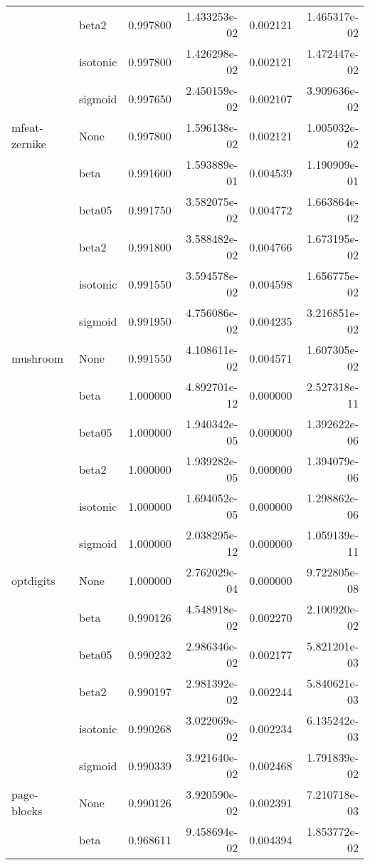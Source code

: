 \begin{tabular}{llrrrr}
        & beta2 &  0.997800 &  1.433253e-02 &  0.002121 &  1.465317e-02 \\
        & isotonic &  0.997800 &  1.426298e-02 &  0.002121 &  1.472447e-02 \\
        & sigmoid &  0.997650 &  2.450159e-02 &  0.002107 &  3.909636e-02 \\
mfeat-zernike & None &  0.997800 &  1.596138e-02 &  0.002121 &  1.005032e-02 \\
        & beta &  0.991600 &  1.593889e-01 &  0.004539 &  1.190909e-01 \\
        & beta05 &  0.991750 &  3.582075e-02 &  0.004772 &  1.663864e-02 \\
        & beta2 &  0.991800 &  3.588482e-02 &  0.004766 &  1.673195e-02 \\
        & isotonic &  0.991550 &  3.594578e-02 &  0.004598 &  1.656775e-02 \\
        & sigmoid &  0.991950 &  4.756086e-02 &  0.004235 &  3.216851e-02 \\
mushroom & None &  0.991550 &  4.108611e-02 &  0.004571 &  1.607305e-02 \\
        & beta &  1.000000 &  4.892701e-12 &  0.000000 &  2.527318e-11 \\
        & beta05 &  1.000000 &  1.940342e-05 &  0.000000 &  1.392622e-06 \\
        & beta2 &  1.000000 &  1.939282e-05 &  0.000000 &  1.394079e-06 \\
        & isotonic &  1.000000 &  1.694052e-05 &  0.000000 &  1.298862e-06 \\
        & sigmoid &  1.000000 &  2.038295e-12 &  0.000000 &  1.059139e-11 \\
optdigits & None &  1.000000 &  2.762029e-04 &  0.000000 &  9.722805e-08 \\
        & beta &  0.990126 &  4.548918e-02 &  0.002270 &  2.100920e-02 \\
        & beta05 &  0.990232 &  2.986346e-02 &  0.002177 &  5.821201e-03 \\
        & beta2 &  0.990197 &  2.981392e-02 &  0.002244 &  5.840621e-03 \\
        & isotonic &  0.990268 &  3.022069e-02 &  0.002234 &  6.135242e-03 \\
        & sigmoid &  0.990339 &  3.921640e-02 &  0.002468 &  1.791839e-02 \\
page-blocks & None &  0.990126 &  3.920590e-02 &  0.002391 &  7.210718e-03 \\
        & beta &  0.968611 &  9.458694e-02 &  0.004394 &  1.853772e-02 \\

\end{tabular}
